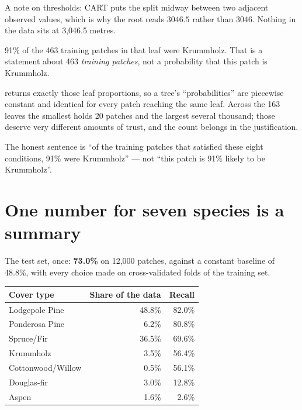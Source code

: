 \documentclass[11pt,a4paper]{article}
\begin{document}
A note on thresholds: CART puts the split midway between two adjacent observed
values, which is why the root reads $3046.5$ rather than $3046$. Nothing in the
data sits at 3{,}046.5 metres.

\begin{failbox}[title={Failure condition --- read the leaf carefully}]
91\% of the 463 training patches in that leaf were Krummholz. That is a
statement about 463 \emph{training patches}, not a probability that this patch
is Krummholz.

 returns exactly those leaf proportions, so a tree's
``probabilities'' are piecewise constant and identical for every patch reaching
the same leaf. Across the 163 leaves the smallest holds 20 patches and the
largest several thousand; those deserve very different amounts of trust, and
the count belongs in the justification.

The honest sentence is ``of the training patches that satisfied these eight
conditions, 91\% were Krummholz'' --- not ``this patch is 91\% likely to be
Krummholz''.
\end{failbox}

\section{One number for seven species is a summary}

The test set, once: \textbf{73.0\%} on 12{,}000 patches, against a constant
baseline of 48.8\%, with every choice made on cross-validated folds of the
training set.

\begin{center}
\small
\begin{tabular}{lrr}
\toprule
\textbf{Cover type} & \textbf{Share of the data} & \textbf{Recall} \\
\midrule
Lodgepole Pine     & 48.8\% & 82.0\% \\
Ponderosa Pine     &  6.2\% & 80.8\% \\
Spruce/Fir         & 36.5\% & 69.6\% \\
Krummholz          &  3.5\% & 56.4\% \\
Cottonwood/Willow  &  0.5\% & 56.1\% \\
Douglas-fir        &  3.0\% & 12.8\% \\
Aspen              &  1.6\% &  2.6\% \\
\bottomrule
\end{tabular}
\end{center}
\end{document}
